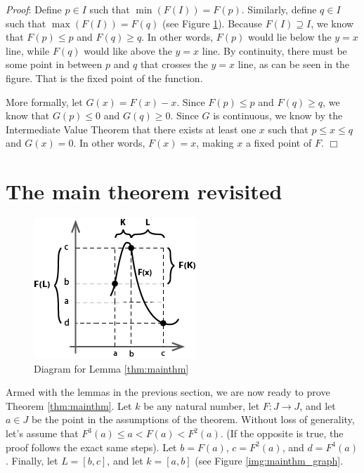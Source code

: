\documentclass[12pt]{IEEEtran}
\begin{document}
{\it Proof}: Define $p \in I$ such that $\min \left( F \left( I \right) \right) = F \left( p \right)$. Similarly, define $q \in I$ such that $\max \left( F \left( I \right) \right) = F \left( q \right)$ (see Figure \ref{fig:fixedpoint_graph}). Because $F \left( I \right) \supseteq I$, we know that $F \left( p \right) \leq p$ and $F \left( q \right) \geq q$. In other words, $F \left( p \right)$ would lie below the $y=x$ line, while $F \left( q \right)$ would like above the $y=x$ line. By continuity, there must be some point in between $p$ and $q$ that crosses the $y=x$ line, as can be seen in the figure. That is the fixed point of the function.

More formally, let $G \left( x \right) = F \left( x \right) - x$. Since $F \left( p \right) \leq p$ and $F \left( q \right) \geq q$, we know that $G \left( p \right) \leq 0$ and $G \left( q \right) \geq 0$. Since $G$ is continuous, we know by the Intermediate Value Theorem that there exists at least one $x$ such that $p \leq x \leq q$ and $G \left( x \right) = 0$. In other words, $F \left(x \right) = x$, making $x$ a fixed point of $F$. $\Box$


\section{The main theorem revisited}

\begin{figure}
	\begin{center}
		\includegraphics{img/mainthm_graph.png}
		\caption{Diagram for Lemma \ref{thm:mainthm}}
        \label{fig:fixedpoint_graph}
	\end{center}
\end{figure}

Armed with the lemmas in the previous section, we are now ready to prove Theorem \ref{thm:mainthm}. Let $k$ be any natural number, let $F : J \rightarrow J$, and let $a \in J$ be the point in the assumptions of the theorem. Without loss of generality, let's assume that $F^3\left(a\right) \leq a < F\left(a\right) < F^2\left(a\right)$. (If the opposite is true, the proof follows the exact same steps). Let $b = F \left( a \right)$, $c = F ^2 \left( a \right)$, and $d = F^4  \left( a \right)$. Finally, let $L = \left[ b, c \right]$, and let $k = \left[ a,b \right]$ (see Figure \ref{img:mainthm_graph}.
\end{document}
